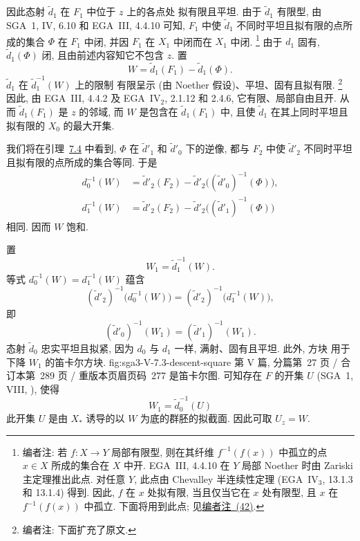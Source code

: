 
因此态射 \(\widetilde d_1\) 在 \(F_1\) 中位于 \(z\) 上的各点处
拟有限且平坦. 由于 \(\widetilde d_1\) 有限型,
由 SGA~1, IV, 6.10 和 EGA~III, 4.4.10 可知,
\(F_1\) 中使 \(\widetilde d_1\) 不同时平坦且拟有限的点所成的集合
\(\Phi\) 在 \(F_1\) 中闭,
并因 \(F_1\) 在 \(X_1\) 中闭而在 \(X_1\) 中闭.%
\footnote{\label{note:sga3-V-40}编者注: 若 \(f:X\to Y\) 局部有限型,
则在其纤维 \(f^{-1}(f(x))\) 中孤立的点 \(x\in X\)
所成的集合在 \(X\) 中开. EGA~III, 4.4.10 在 \(Y\)
局部 Noether 时由 Zariski 主定理推出此点.
对任意 \(Y\), 此点由 Chevalley 半连续性定理
(EGA~IV\(_3\), 13.1.3 和 13.1.4) 得到.
因此, \(f\) 在 \(x\) 处拟有限, 当且仅当它在 \(x\) 处有限型,
且 \(x\) 在 \(f^{-1}(f(x))\) 中孤立.
下面将用到此点; 见\hyperref[note:sga3-V-42]{编者注~(42)}.}
由于 \(d_1\) 固有, \(\widetilde d_1(\Phi)\) 闭,
且由前述内容知它不包含 \(z\). 置
\[
  W=\widetilde d_1(F_1)-\widetilde d_1(\Phi).
\]
\(\widetilde d_1\) 在 \(\widetilde d_1^{-1}(W)\) 上的限制
有限呈示 (由 Noether 假设)、平坦、固有且拟有限.%
\footnote{\label{note:sga3-V-41}编者注: 下面扩充了原文.}
因此, 由 EGA~III, 4.4.2 及 EGA~IV\(_2\), 2.1.12 和 2.4.6,
它有限、局部自由且开. 从而 \(\widetilde d_1(F_1)\) 是 \(z\) 的邻域,
而 \(W\) 是包含在 \(\widetilde d_1(F_1)\) 中,
且使 \(\widetilde d_1\) 在其上同时平坦且拟有限的 \(X_0\) 的最大开集.

我们将在引理~\hyperref[lem:sga3-V-7.4]{7.4} 中看到,
\(\Phi\) 在 \(\widetilde d'_1\) 和 \(\widetilde d'_0\) 下的逆像,
都与 \(F_2\) 中使 \(\widetilde d'_2\) 不同时平坦且拟有限的点所成的集合等同.
于是
\[
\begin{aligned}
  d_0^{-1}(W)
  &=
  \widetilde d'_2(F_2)
  -
  \widetilde d'_2\bigl((\widetilde d'_0)^{-1}(\Phi)\bigr),\\
  d_1^{-1}(W)
  &=
  \widetilde d'_2(F_2)
  -
  \widetilde d'_2\bigl((\widetilde d'_1)^{-1}(\Phi)\bigr)
\end{aligned}
\]
相同. 因而 \(W\) 饱和.

置
\[
  W_1=\widetilde d_1^{-1}(W).
\]
等式 \(d_0^{-1}(W)=d_1^{-1}(W)\) 蕴含
\[
  (\widetilde d'_2)^{-1}\bigl(d_0^{-1}(W)\bigr)
  =
  (\widetilde d'_2)^{-1}\bigl(d_1^{-1}(W)\bigr),
\]
即
\[
  (\widetilde d'_0)^{-1}(W_1)
  =
  (\widetilde d'_1)^{-1}(W_1).
\]
态射 \(\widetilde d_0\) 忠实平坦且拟紧,
因为 \(d_0\) 与 \(d_1\) 一样, 满射、固有且平坦.
此外, 方块
  {用于下降 \(W_1\) 的笛卡尔方块.}
  {fig:sga3-V-7.3-descent-square}
  {第 V 篇, 分篇第~27 页 / 合订本第~289 页 / 重版本页眉页码~277}
是笛卡尔图. 可知存在 \(F\) 的开集 \(U\)
(SGA~1, VIII, ), 使得
\[
  W_1=\widetilde d_0^{-1}(U)
\]
此开集 \(U\) 是由 \(X_\ast\) 诱导的以 \(W\) 为底的群胚的拟截面.
因此可取 \(U_z=W\).


